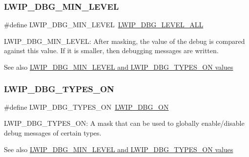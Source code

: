 \subsubsection{\texorpdfstring{L\+W\+I\+P\+\_\+\+D\+B\+G\+\_\+\+M\+I\+N\+\_\+\+L\+E\+V\+EL}{LWIP\_DBG\_MIN\_LEVEL}\hspace{0.1cm}{\footnotesize\ttfamily [2/2]}}
{\footnotesize\ttfamily \#define L\+W\+I\+P\+\_\+\+D\+B\+G\+\_\+\+M\+I\+N\+\_\+\+L\+E\+V\+EL~\hyperlink{group__debugging__levels_ga8ebaeb006b43f55897f3196b3617dc87}{L\+W\+I\+P\+\_\+\+D\+B\+G\+\_\+\+L\+E\+V\+E\+L\+\_\+\+A\+LL}}

L\+W\+I\+P\+\_\+\+D\+B\+G\+\_\+\+M\+I\+N\+\_\+\+L\+E\+V\+EL\+: After masking, the value of the debug is compared against this value. If it is smaller, then debugging messages are written. \begin{DoxySeeAlso}{See also}
\hyperlink{group__debugging__levels}{L\+W\+I\+P\+\_\+\+D\+B\+G\+\_\+\+M\+I\+N\+\_\+\+L\+E\+V\+E\+L and L\+W\+I\+P\+\_\+\+D\+B\+G\+\_\+\+T\+Y\+P\+E\+S\+\_\+\+O\+N values} 
\end{DoxySeeAlso}
\mbox{\label{group__lwip__opts__debugmsg_gac095d0e53f5eb5b326b2cccfd071d93d}} 
\subsubsection{\texorpdfstring{L\+W\+I\+P\+\_\+\+D\+B\+G\+\_\+\+T\+Y\+P\+E\+S\+\_\+\+ON}{LWIP\_DBG\_TYPES\_ON}\hspace{0.1cm}{\footnotesize\ttfamily [1/2]}}
{\footnotesize\ttfamily \#define L\+W\+I\+P\+\_\+\+D\+B\+G\+\_\+\+T\+Y\+P\+E\+S\+\_\+\+ON~\hyperlink{group__debugging__levels_ga9e31b7cbbc8f46af8e62b548079acd4e}{L\+W\+I\+P\+\_\+\+D\+B\+G\+\_\+\+ON}}

L\+W\+I\+P\+\_\+\+D\+B\+G\+\_\+\+T\+Y\+P\+E\+S\+\_\+\+ON\+: A mask that can be used to globally enable/disable debug messages of certain types. \begin{DoxySeeAlso}{See also}
\hyperlink{group__debugging__levels}{L\+W\+I\+P\+\_\+\+D\+B\+G\+\_\+\+M\+I\+N\+\_\+\+L\+E\+V\+E\+L and L\+W\+I\+P\+\_\+\+D\+B\+G\+\_\+\+T\+Y\+P\+E\+S\+\_\+\+O\+N values} 
\end{DoxySeeAlso}
\mbox{\label{group__lwip__opts__debugmsg_gac095d0e53f5eb5b326b2cccfd071d93d}} 
